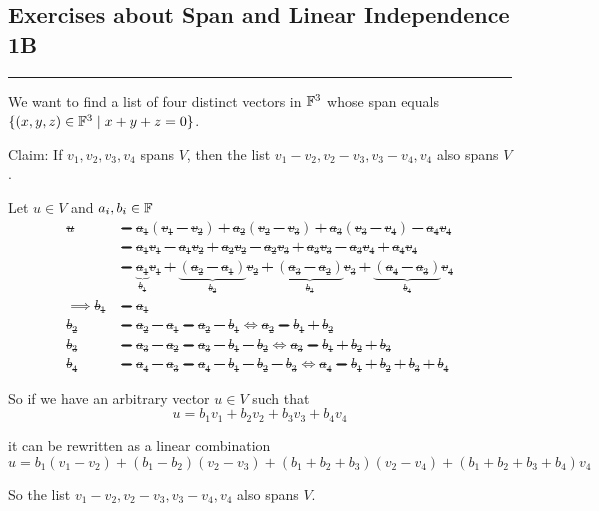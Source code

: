 \subsection*{Exercises about Span and Linear Independence 1B}
\hrule
\phantom{.}

\begin{xrcs}
  We want to find a list of four distinct vectors in $\mathbb{F}^3$ whose span equals $\{(x,y,z) \in \mathbb{F}^3 \mid x + y + z = 0 \}$.
\end{xrcs}

\begin{xrcs}
  Claim: If $v_1, v_2, v_3, v_4$ spans $V$, then the list $v_1 - v_2, v_2 -v_3, v_3 -v_4, v_4$ also spans $V$.

  \begin{prf}
    Let $u \in V$ and $a_i, b_i \in \mathbb{F}$ \st
    \[
    \begin{aligned}
      u
      &= a_1 (v_1 -v_2) + a_2 (v_2-v_3) + a_3 (v_3-v_4)-a_4 v_4 \\
      &= a_1 v_1 - a_1 v_2 + a_2v_2 - a_2 v_3 + a_3 v_3 - a_3 v_4 + a_4 v_4 \\
      &= \underbrace{a_1}_{b_1} v_1 + \underbrace{(a_2 -a_1)}_{b_2} v_2 + \underbrace{(a_3 -a_2)}_{b_3} v_3 + \underbrace{(a_4 -a_3)}_{b_4} v_4 \\
      \implies b_1 & = a_1 \\
      b_2 &= a_2 -a_1 = a_2 - b_1 \iff a_2 = b_1 + b_2 \\
      b_3 &= a_3 - a_2 = a_3 - b_1 -b_2 \iff a_3 = b_1 + b_2 + b_3 \\
      b_4 &= a_4 - a_3 = a_4 - b_1 - b_2 - b_3 \iff a_4 = b_1 + b_2 + b_3 + b_4
    \end{aligned}
    \]

    So if we have an arbitrary vector $u \in V$ such that
    \[
    u = b_1 v_1 +  b_2 v_2 + b_3 v_3 + b_4 v_4
    \]

    it can be rewritten as a linear combination
    \[
    u = b_1 (v_1 - v_2) + (b_1-b_2)(v_2-v_3) + (b_1+b_2+b_3)(v_2-v_4)+(b_1+b_2+b_3+b_4)v_4
    \]

    So the list $v_1 - v_2, v_2 -v_3, v_3 -v_4, v_4$ also spans $V$.
  \end{prf}
\end{xrcs}


